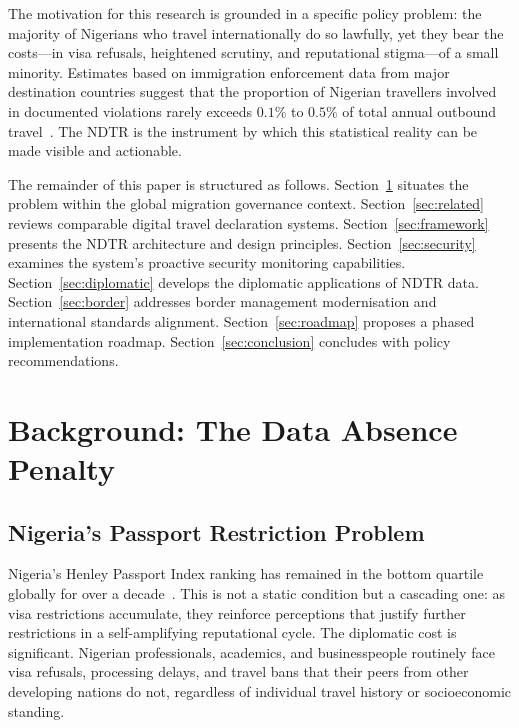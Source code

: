 \documentclass[11pt]{article}
\begin{document}
The motivation for this research is grounded in a specific policy problem:
the majority of Nigerians who travel internationally do so lawfully,
yet they bear the costs---in visa refusals, heightened scrutiny, and
reputational stigma---of a small minority. Estimates based on
immigration enforcement data from major destination countries suggest
that the proportion of Nigerian travellers involved in documented
violations rarely exceeds \(0.1\%\) to \(0.5\%\) of total annual
outbound travel~\cite{iom2023,unodc2022}. The NDTR is the instrument
by which this statistical reality can be made visible and actionable.

The remainder of this paper is structured as follows.
Section~\ref{sec:background} situates the problem within the global
migration governance context.
Section~\ref{sec:related} reviews comparable digital travel declaration
systems.
Section~\ref{sec:framework} presents the NDTR architecture and design
principles.
Section~\ref{sec:security} examines the system's proactive security
monitoring capabilities.
Section~\ref{sec:diplomatic} develops the diplomatic applications of NDTR
data.
Section~\ref{sec:border} addresses border management modernisation and
international standards alignment.
Section~\ref{sec:roadmap} proposes a phased implementation roadmap.
Section~\ref{sec:conclusion} concludes with policy recommendations.

\section{Background: The Data Absence Penalty}
\label{sec:background}

\subsection{Nigeria's Passport Restriction Problem}

Nigeria's Henley Passport Index ranking has remained in the bottom
quartile globally for over a decade~\cite{henley2025}. This is not a
static condition but a cascading one: as visa restrictions accumulate,
they reinforce perceptions that justify further restrictions in a
self-amplifying reputational cycle. The diplomatic cost is significant.
Nigerian professionals, academics, and businesspeople routinely face
visa refusals, processing delays, and travel bans that their peers
from other developing nations do not, regardless of individual
travel history or socioeconomic standing.
\end{document}
